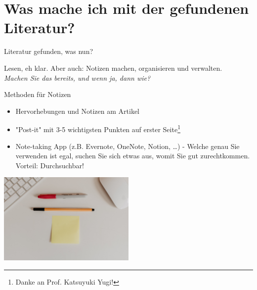 \documentclass{beamer}
\begin{document}





\section{Was mache ich mit der gefundenen Literatur?}

\begin{frame}{Literatur gefunden, was nun?}

\pause

Lesen, eh klar. \pause Aber auch: Notizen machen, organisieren und verwalten.  \\

\emph{Machen Sie das bereits, und wenn ja, dann wie?}

    
\end{frame}

\begin{frame}{Methoden für Notizen}

\begin{itemize}
    \item 
Hervorhebungen und Notizen am Artikel
\item 
"Post-it" mit 3-5 wichtigsten Punkten auf erster Seite\footnote{Danke an Prof. Katsuyuki Yugi!}
    \item
    Note-taking App (z.B. Evernote, OneNote, Notion, \dots) - Welche genau Sie verwenden ist egal, suchen Sie sich etwas aus, womit Sie gut zurechtkommen. Vorteil: Durchsuchbar!
\end{itemize}

\begin{center}
    \includegraphics[width=0.5\textwidth]{kelly-sikkema-QtSDRxvZHQc-unsplash.jpg}
\end{center}

\end{frame}
\end{document}

